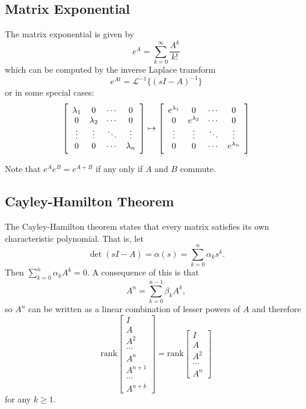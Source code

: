 \documentclass{report}
\begin{document}
\subsection{Matrix Exponential}
The matrix exponential is given by
$$
e^{A} = \sum_{k=0}^\infty \frac{A^k}{k!}
$$
which can be computed by the inverse Laplace transform
$$
e^{At} = \mathcal{L}^{-1}\{(sI - A)^{-1}\}
$$
or in some special cases:
$$
\left[\begin{array}{c c c c}
  \lambda_1 & 0          & \cdots & 0      \\
  0         & \lambda_2  & \cdots & 0      \\
  \vdots    & \vdots     & \ddots & \vdots \\
  0         & 0          & \cdots & \lambda_n
\end{array}\right]
\mapsto
\left[\begin{array}{c c c c}
  e^{\lambda_1} & 0           & \cdots & 0      \\
  0           & e^{\lambda_2} & \cdots & 0      \\
  \vdots      & \vdots      & \ddots & \vdots \\
  0           & 0           & \cdots & e^{\lambda_n}
\end{array}\right]
$$

Note that $e^{A} e^{B} = e^{A + B}$ if any only if $A$ and $B$ commute.

\subsection{Cayley-Hamilton Theorem}
The Cayley-Hamilton theorem states that every matrix satisfies its own
characteristic polynomial. That is, let
$$
\det (sI - A) = \alpha(s) = \sum_{k=0}^{n} \alpha_k s^k.
$$
Then $\sum_{k=0}^{n} \alpha_k A^k = 0$. A consequence of this is
that
$$
A^n = \sum_{k=0}^{n-1} \beta_k A^k,
$$
so $A^n$ can be written as a linear combination of lesser powers of
$A$ and therefore
$$
\mathrm{rank}
\left[\begin{array}{c}
  I      \\
  A      \\
  A^2    \\
  \cdots \\
  A^n    \\
  A^{n+1} \\
  \cdots \\
  A^{n+k}
\end{array}\right]
=
\mathrm{rank}
\left[\begin{array}{c}
  I      \\
  A      \\
  A^2    \\
  \cdots \\
  A^n
\end{array}\right]
$$
for any $k \geq 1$.
\end{document}
